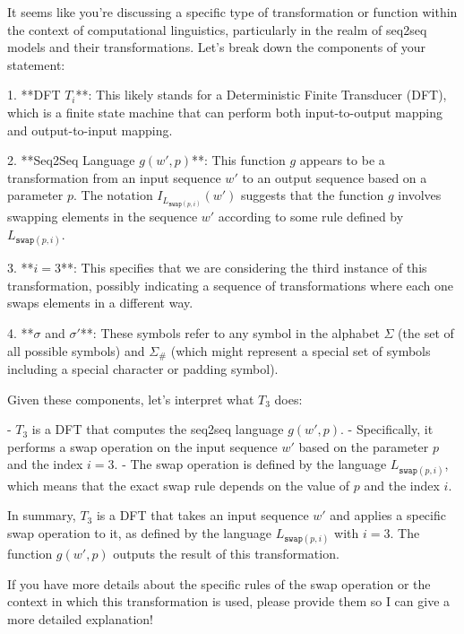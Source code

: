 It seems like you're discussing a specific type of transformation or function within the context of computational linguistics, particularly in the realm of seq2seq models and their transformations. Let's break down the components of your statement:

1. **DFT \( T_i \)**: This likely stands for a Deterministic Finite Transducer (DFT), which is a finite state machine that can perform both input-to-output mapping and output-to-input mapping.

2. **Seq2Seq Language \( g(w', p) \)**: This function \( g \) appears to be a transformation from an input sequence \( w' \) to an output sequence based on a parameter \( p \). The notation \( I_{L_{\texttt{swap}(p,i)}}(w') \) suggests that the function \( g \) involves swapping elements in the sequence \( w' \) according to some rule defined by \( L_{\texttt{swap}(p,i)} \).

3. **\( i = 3 \)**: This specifies that we are considering the third instance of this transformation, possibly indicating a sequence of transformations where each one swaps elements in a different way.

4. **\( \sigma \) and \( \sigma' \)**: These symbols refer to any symbol in the alphabet \( \Sigma \) (the set of all possible symbols) and \( \Sigma_{\#} \) (which might represent a special set of symbols including a special character or padding symbol).

Given these components, let's interpret what \( T_3 \) does:

- \( T_3 \) is a DFT that computes the seq2seq language \( g(w', p) \).
- Specifically, it performs a swap operation on the input sequence \( w' \) based on the parameter \( p \) and the index \( i = 3 \).
- The swap operation is defined by the language \( L_{\texttt{swap}(p,i)} \), which means that the exact swap rule depends on the value of \( p \) and the index \( i \).

In summary, \( T_3 \) is a DFT that takes an input sequence \( w' \) and applies a specific swap operation to it, as defined by the language \( L_{\texttt{swap}(p,i)} \) with \( i = 3 \). The function \( g(w', p) \) outputs the result of this transformation.

If you have more details about the specific rules of the swap operation or the context in which this transformation is used, please provide them so I can give a more detailed explanation!